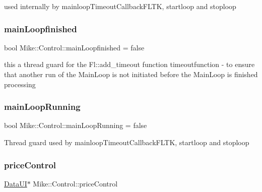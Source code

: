 used internally by mainloop\+Timeout\+Callback\+F\+L\+TK, startloop and stoploop \mbox{\label{class_mike_1_1_control_a7749b97976e1bb3e7ea49c7d63531dfc}} 
\subsubsection{\texorpdfstring{main\+Loopfinished}{mainLoopfinished}}
{\footnotesize\ttfamily bool Mike\+::\+Control\+::main\+Loopfinished = false\hspace{0.3cm}{\ttfamily [private]}}

this a \textquotesingle{}thread guard\textquotesingle{} for the Fl\+::add\+\_\+timeout function timeoutfunction -\/ to ensure that another run of the Main\+Loop is not initiated before the Main\+Loop is finished processing \mbox{\label{class_mike_1_1_control_af17a58f80bda54fda5b0a5167c8f04ed}} 
\subsubsection{\texorpdfstring{main\+Loop\+Running}{mainLoopRunning}}
{\footnotesize\ttfamily bool Mike\+::\+Control\+::main\+Loop\+Running = false\hspace{0.3cm}{\ttfamily [private]}}

\textquotesingle{}Thread guard\textquotesingle{} used by mainloop\+Timeout\+Callback\+F\+L\+TK, startloop and stoploop \mbox{\label{class_mike_1_1_control_a61d38447360ba0baa9ac8a3607de0c5b}} 
\subsubsection{\texorpdfstring{price\+Control}{priceControl}}
{\footnotesize\ttfamily \hyperlink{class_mike_1_1_control_addbe39ef40982f0a4002b6f74091a799}{Data\+UI}$\ast$ Mike\+::\+Control\+::price\+Control\hspace{0.3cm}{\ttfamily [private]}}

